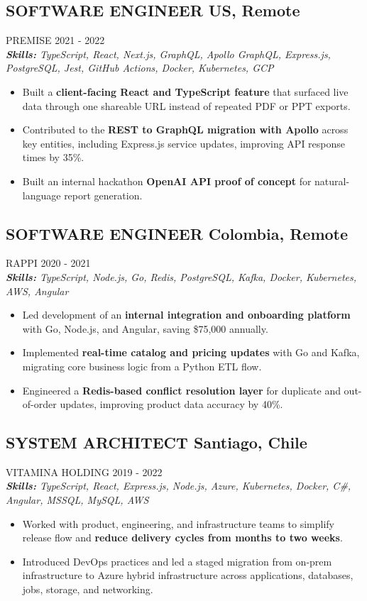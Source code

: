 \documentclass{article}
\newcommand{\WorkExperience}[2]{
   \subsection*{#1}
   \vspace{-1em}
   \uppercase{#2}
}
\newcommand{\Skills}[1]{
   \textit{\textbf{Skills:} #1}
}
\begin{document}
\WorkExperience{SOFTWARE ENGINEER \hfill US, Remote}{Premise \hfill 2021 {-} 2022} \\
\Skills{TypeScript, React, Next.js, GraphQL, Apollo GraphQL, Express.js, PostgreSQL, Jest, GitHub Actions, Docker, Kubernetes, GCP}
\begin{itemize}
	\item Built a \textbf{client-facing React and TypeScript feature} that surfaced live data through one shareable URL instead of repeated PDF or PPT exports.
	\item Contributed to the \textbf{REST to GraphQL migration with Apollo} across key entities, including Express.js service updates, improving API response times by 35\%.
	\item Built an internal hackathon \textbf{OpenAI API proof of concept} for natural-language report generation.
\end{itemize}

\WorkExperience{SOFTWARE ENGINEER \hfill Colombia, Remote}{Rappi \hfill 2020 {-} 2021} \\
\Skills{TypeScript, Node.js, Go, Redis, PostgreSQL, Kafka, Docker, Kubernetes, AWS, Angular}
\begin{itemize}
	\item Led development of an \textbf{internal integration and onboarding platform} with Go, Node.js, and Angular, saving \$75,000 annually.
	\item Implemented \textbf{real-time catalog and pricing updates} with Go and Kafka, migrating core business logic from a Python ETL flow.
	\item Engineered a \textbf{Redis-based conflict resolution layer} for duplicate and out-of-order updates, improving product data accuracy by 40\%.
\end{itemize}

\WorkExperience{SYSTEM ARCHITECT \hfill Santiago, Chile}{Vitamina Holding \hfill 2019 {-} 2022} \\
\Skills{TypeScript, React, Express.js, Node.js, Azure, Kubernetes, Docker, C\#, Angular, MSSQL, MySQL, AWS}
\begin{itemize}
	\item Worked with product, engineering, and infrastructure teams to simplify release flow and \textbf{reduce delivery cycles from months to two weeks}.
	\item Introduced DevOps practices and led a staged migration from on-prem infrastructure to Azure hybrid infrastructure across applications, databases, jobs, storage, and networking.
\end{itemize}
\end{document}

